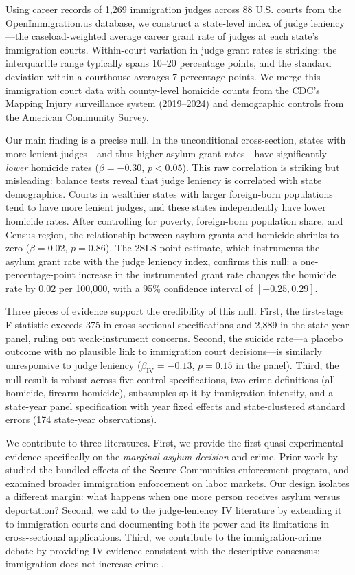 \documentclass[12pt]{article}
\begin{document}
Using career records of 1,269 immigration judges across 88 U.S. courts from the OpenImmigration.us database, we construct a state-level index of judge leniency---the caseload-weighted average career grant rate of judges at each state's immigration courts. Within-court variation in judge grant rates is striking: the interquartile range typically spans 10--20 percentage points, and the standard deviation within a courthouse averages 7 percentage points. We merge this immigration court data with county-level homicide counts from the CDC's Mapping Injury surveillance system (2019--2024) and demographic controls from the American Community Survey.

Our main finding is a precise null. In the unconditional cross-section, states with more lenient judges---and thus higher asylum grant rates---have significantly \textit{lower} homicide rates ($\beta = -0.30$, $p < 0.05$). This raw correlation is striking but misleading: balance tests reveal that judge leniency is correlated with state demographics. Courts in wealthier states with larger foreign-born populations tend to have more lenient judges, and these states independently have lower homicide rates. After controlling for poverty, foreign-born population share, and Census region, the relationship between asylum grants and homicide shrinks to zero ($\beta = 0.02$, $p = 0.86$). The 2SLS point estimate, which instruments the asylum grant rate with the judge leniency index, confirms this null: a one-percentage-point increase in the instrumented grant rate changes the homicide rate by 0.02 per 100,000, with a 95\% confidence interval of $[-0.25, 0.29]$.

Three pieces of evidence support the credibility of this null. First, the first-stage F-statistic exceeds 375 in cross-sectional specifications and 2,889 in the state-year panel, ruling out weak-instrument concerns. Second, the suicide rate---a placebo outcome with no plausible link to immigration court decisions---is similarly unresponsive to judge leniency ($\beta_{\text{IV}} = -0.13$, $p = 0.15$ in the panel). Third, the null result is robust across five control specifications, two crime definitions (all homicide, firearm homicide), subsamples split by immigration intensity, and a state-year panel specification with year fixed effects and state-clustered standard errors (174 state-year observations).

We contribute to three literatures. First, we provide the first quasi-experimental evidence specifically on the \textit{marginal asylum decision} and crime. Prior work by \citet{miles2014} studied the bundled effects of the Secure Communities enforcement program, and \citet{east2023} examined broader immigration enforcement on labor markets. Our design isolates a different margin: what happens when one more person receives asylum versus deportation? Second, we add to the judge-leniency IV literature \citep{kling2006, dobbie2018, chen2016} by extending it to immigration courts and documenting both its power and its limitations in cross-sectional applications. Third, we contribute to the immigration-crime debate by providing IV evidence consistent with the descriptive consensus: immigration does not increase crime \citep{ousey2018, butcher2007, reid2005}.
\end{document}

